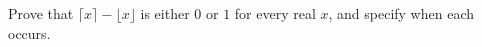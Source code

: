 Prove that $\lceil x\rceil-\lfloor x\rfloor$ is either $0$ or $1$ for every real $x$, and specify when each occurs.
